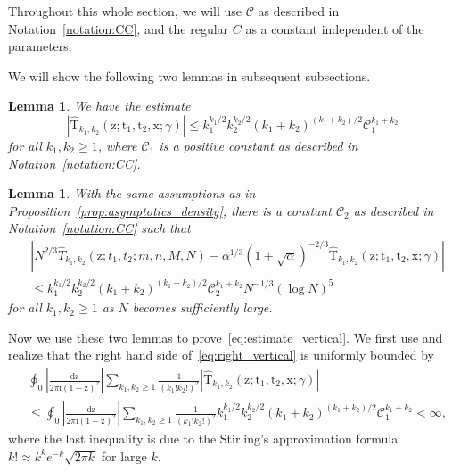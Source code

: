 \documentclass{article}
\newtheorem{lm}[thm]{Lemma}
\numberwithin{equation}{section}
\newcommand{\CC}{\mathcal{C}}
\newcommand{\ddbar}[2]{\frac{{\mathrm d}#1}{2\pi {\mathrm i}#2}}
\begin{document}
Throughout this whole section, we will use $\CC$ as described in Notation~\ref{notation:CC}, and the regular $C$ as a constant independent of the parameters.


We will show the following two lemmas in subsequent subsections.

\begin{lm}
	\label{lm:hat_rt_uniform_bounds}
	We have the estimate
	\begin{equation*}
		\left|\mathrm{\hat T}_{k_1,k_2}(\mathrm{z};\mathrm{t}_1,\mathrm{t}_2,\mathrm{x};\gamma)\right| \le k_1^{k_1/2}k_2^{k_2/2}(k_1+k_2)^{(k_1+k_2)/2}\CC_1^{k_1+k_2}
	\end{equation*}
	for all $k_1,k_2\ge 1$, where  $\CC_1$ is a positive constant as described in Notation~\ref{notation:CC}.
\end{lm}

\begin{lm}
	\label{lm:estimate_error}
		With the same assumptions as in Proposition~\ref{prop:asymptotics_density}, there is a constant $\CC_2$ as described in Notation~\ref{notation:CC} such that
	\begin{equation}
		\begin{split}
		&\left|N^{2/3}\hat T_{k_1,k_2}(\mathrm{z};t_1,t_2;m,n,M,N)-\alpha^{1/3}(1+\sqrt{\alpha})^{-2/3}\mathrm{\hat T}_{k_1,k_2}(\mathrm{z};\mathrm{t}_1,\mathrm{t}_2,\mathrm{x};\gamma)
		\right|\\
		&\le k_1^{k_1/2}k_2^{k_2/2}(k_1+k_2)^{(k_1+k_2)/2}\CC_2^{k_1+k_2} N^{-1/3}(\log N)^5
		\end{split}
	\end{equation}
for all $k_1,k_2\ge 1$ as $N$ becomes sufficiently large.
\end{lm}


Now we use these two lemmas to prove~\eqref{eq:estimate_vertical}. We first use  and realize that the right hand side of~\eqref{eq:right_vertical} is uniformly bounded  by
\begin{equation*}
	\begin{split}
	&\oint_0\left|\ddbar{\mathrm{z}}{\mathrm{(1-z)^2}}\right|\sum_{k_1,k_2\ge 1}
	\frac{1}{(k_1!k_2!)^2}
	\left|\mathrm{\hat T}_{k_1,k_2}(\mathrm{z};\mathrm{t}_1,\mathrm{t}_2,\mathrm{x};\gamma)\right|\\
	&\le \oint_0\left|\ddbar{\mathrm{z}}{\mathrm{(1-z)^2}}\right|\sum_{k_1,k_2\ge 1}
	\frac{1}{(k_1!k_2!)^2} k_1^{k_1/2}k_2^{k_2/2}(k_1+k_2)^{(k_1+k_2)/2}\CC_1^{k_1+k_2}<\infty,
	\end{split}
\end{equation*}
where the last inequality is due to the Stirling's approximation formula $k!\approx k^ke^{-k}\sqrt{2\pi k}$ for large $k$.
\end{document}
